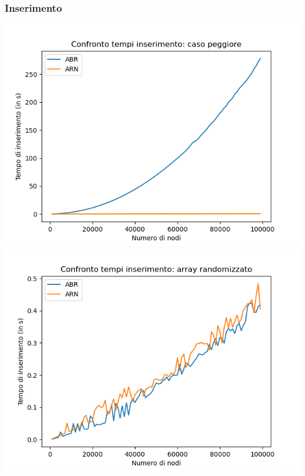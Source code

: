 \documentclass[
]{article}
\begin{document}
\hypertarget{inserimento}{%
\subsubsection{Inserimento}\label{inserimento}}
\includegraphics{../../img/w_case/ins.png}
\includegraphics{../../img/rand/ins.png}
\end{document}
